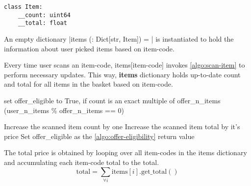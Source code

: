 \documentclass[11pt,a4paper,oneside,onecolumn]{article}
\begin{document}
\begin{verbatim}
class Item:
    __count: uint64
    __total: float
\end{verbatim}

 An empty dictionary 
  |items (: Dict[str, Item]) = {}|
 is instantiated to hold the information about user picked items based on item-code.

Every time user scans an item-code, items[item-code] invokes \cref{algo:scan-item} to
perform necessary updates.
This way, \textbf{items} dictionary holds up-to-date count and total for all items
in the basket based on item-code.

\begin{algorithm}[H]
\DontPrintSemicolon
\SetAlgoLined
\caption{Check if eligible for offer at present}
\label{algo:offer-eligibility}
  
  
 {
 set offer\_eligible to True, if count is an exact multiple of offer\_n\_items 
	(user\_n\_items \% offer\_n\_items == 0)\;
 }
\end{algorithm}

\begin{algorithm}[H]
\DontPrintSemicolon
\SetAlgoLined
\caption{Scan an item and update necessary details}
\label{algo:scan-item}

  
 Increase the scanned item count by one\;
 Increase the scanned item total by it's price\;
 Set offer\_eligible as the \cref{algo:offer-eligibility} return value\;
 
\end{algorithm}


The total price is obtained by looping over all item-codes in the items dictionary and 
accumulating each item-code total to the total.
\begin{equation}
\mathrm{total} = \sum_{\forall i}\mathrm{items}[i].\mathrm{get\_total()}
\end{equation}
	
\end{document}
